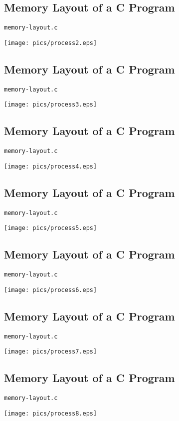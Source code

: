 \documentclass[xga]{xdvislides}
\begin{document}
\subsection{Memory Layout of a C Program}
{\tt memory-layout.c}
\begin{center}
	\texttt{[image: pics/process2.eps]}
\end{center}

\subsection{Memory Layout of a C Program}
{\tt memory-layout.c}
\begin{center}
	\texttt{[image: pics/process3.eps]}
\end{center}

\subsection{Memory Layout of a C Program}
{\tt memory-layout.c}
\begin{center}
	\texttt{[image: pics/process4.eps]}
\end{center}

\subsection{Memory Layout of a C Program}
{\tt memory-layout.c}
\begin{center}
	\texttt{[image: pics/process5.eps]}
\end{center}

\subsection{Memory Layout of a C Program}
{\tt memory-layout.c}
\begin{center}
	\texttt{[image: pics/process6.eps]}
\end{center}

\subsection{Memory Layout of a C Program}
{\tt memory-layout.c}
\begin{center}
	\texttt{[image: pics/process7.eps]}
\end{center}

\subsection{Memory Layout of a C Program}
{\tt memory-layout.c}
\begin{center}
	\texttt{[image: pics/process8.eps]}
\end{center}
\end{document}
